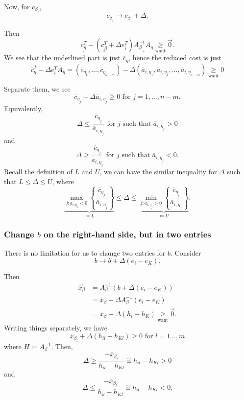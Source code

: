 Now, for \(c_{\beta_{i}}\),
\[
	c_{\beta_{i}}\to c_{\beta_{i}}+\Delta.
\]

Then
\[
	\underline{c_{\eta}^{T}} - (\underline{c_{\beta}^{T}} + \Delta e_{i}^{T}) \underline{A^{-1}_{\beta}A_{\eta}}\underset{\text{want}}{\geq} \vec{0}.
\]
We see that the underlined part is just \(\overline{c}_{\eta}\), hence the reduced cost is just
\[
	\overline{c}_{\eta}^{T} - \Delta e_{i}^{T}\overline{A}_{\eta} = (\overline{c}_{\eta_1}, \ldots , \overline{c}_{\eta_{n-m}}) - \Delta(\overline{a}_{i, \eta_1}, \overline{a}_{i, \eta_2}, \ldots , \overline{a}_{i, \eta_{n-m}})\underset{\text{want}}{\geq} 0
\]

Separate them, we see
\[
	\overline{c}_{\eta_{j}} - \Delta \overline{a}_{i, \eta_{j}} \geq 0 \text{ for }j = 1, \ldots , n-m.
\]
Equivalently,
\[
	\Delta\leq \frac{\overline{c}_{\eta_{j}}}{\overline{a}_{i, \eta_{j}}} \text{ for }j \text{ such that }\overline{a}_{i, \eta_{j}}>0
\]
and
\[
	\Delta\geq \frac{\overline{c}_{\eta_{j}}}{\overline{a}_{i, \eta_{j}}} \text{ for }j \text{ such that }\overline{a}_{i, \eta_{j}}<0.
\]
Recall the definition of \(L\) and \(U\), we can have the similar inequality for \(\Delta\) such that \(L\leq \Delta\leq U\), where
\[
	\underbrace{\max_{j\colon \overline{a}_{i, \eta_{j}} < 0}\left\{ \frac{\overline{c}_{\eta_{j}}}{\overline{a}_{i, \eta_{j}}} \right\}}_{\coloneqq L} \leq \Delta \leq \underbrace{\min_{j\colon \overline{a}_{i, \eta_{j}} > 0}\left\{ \frac{\overline{c}_{\eta_{j}}}{\overline{a}_{i, \eta_{j}}} \right\}}_{\coloneqq U}.
\]

\subsubsection{Change \(b\) on the right-hand side, but in two entries}
There is no limitation for us to change two entries for \(b\). Consider
\[
	b\to b+\Delta(e_{i} - e_{K}).
\]

Then
\[
	\begin{split}
		\overline{x}_{\beta}^\prime &= A_{\beta}^{-1}(b+\Delta(e_{i} - e_K))\\
		&= \overline{x}_{\beta}+\Delta A^{-1}_{\beta}(e_{i} - e_K)\\
		&= \overline{x}_{\beta}+\Delta(h_{i} - h_K)\underset{\text{want}}{\geq} \vec{0}.
	\end{split}
\]
Writing things separately, we have
\[
	\overline{x}_{\beta_l} + \Delta(h_{il} - h_{Kl}) \geq 0 \text{ for }l = 1\ldots , m
\]
where \(H\coloneqq A^{-1}_{\beta}\).
Then,
\[
	\Delta\geq \frac{-\overline{x}_{\beta_l}}{h_{il} - h_{Kl}} \text{ if }h_{il} - h_{Kl} > 0
\]
and
\[
	\Delta\leq \frac{-\overline{x}_{\beta_l}}{h_{il} - h_{Kl}} \text{ if }h_{il} - h_{Kl} < 0.
\]

